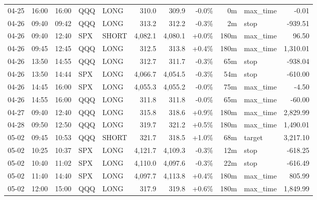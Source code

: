 \documentclass[11pt,a4paper,twoside]{article}
\begin{document}
\begin{center}
\begin{longtable}{>{\color{txtmain}}l l l l l r r r r >{\color{txtmain}}l r}
04-25 & 16:00 & 16:00 & QQQ & LONG & 310.0 & 309.9 & \textcolor{lossred}{-0.0\%} & 0m & max\_time & \textcolor{lossred}{-0.01} \\
04-26 & 09:40 & 09:42 & QQQ & LONG & 313.2 & 312.2 & \textcolor{lossred}{-0.3\%} & 2m & stop & \textcolor{lossred}{-939.51} \\
04-26 & 09:40 & 12:40 & SPX & SHORT & 4,082.1 & 4,080.1 & \textcolor{wingreen}{+0.0\%} & 180m & max\_time & \textcolor{wingreen}{96.50} \\
04-26 & 09:45 & 12:45 & QQQ & LONG & 312.5 & 313.8 & \textcolor{wingreen}{+0.4\%} & 180m & max\_time & \textcolor{wingreen}{1,310.01} \\
04-26 & 13:50 & 14:55 & QQQ & LONG & 312.7 & 311.7 & \textcolor{lossred}{-0.3\%} & 65m & stop & \textcolor{lossred}{-938.04} \\
04-26 & 13:50 & 14:44 & SPX & LONG & 4,066.7 & 4,054.5 & \textcolor{lossred}{-0.3\%} & 54m & stop & \textcolor{lossred}{-610.00} \\
04-26 & 14:45 & 16:00 & SPX & LONG & 4,055.3 & 4,055.2 & \textcolor{lossred}{-0.0\%} & 75m & max\_time & \textcolor{lossred}{-4.50} \\
04-26 & 14:55 & 16:00 & QQQ & LONG & 311.8 & 311.8 & \textcolor{lossred}{-0.0\%} & 65m & max\_time & \textcolor{lossred}{-60.00} \\
04-27 & 09:40 & 12:40 & QQQ & LONG & 315.8 & 318.6 & \textcolor{wingreen}{+0.9\%} & 180m & max\_time & \textcolor{wingreen}{2,829.99} \\
04-28 & 09:50 & 12:50 & QQQ & LONG & 319.7 & 321.2 & \textcolor{wingreen}{+0.5\%} & 180m & max\_time & \textcolor{wingreen}{1,490.01} \\
05-02 & 09:45 & 10:53 & QQQ & SHORT & 321.7 & 318.5 & \textcolor{wingreen}{+1.0\%} & 68m & target & \textcolor{wingreen}{3,217.10} \\
05-02 & 10:25 & 10:37 & SPX & LONG & 4,121.7 & 4,109.3 & \textcolor{lossred}{-0.3\%} & 12m & stop & \textcolor{lossred}{-618.25} \\
05-02 & 10:40 & 11:02 & SPX & LONG & 4,110.0 & 4,097.6 & \textcolor{lossred}{-0.3\%} & 22m & stop & \textcolor{lossred}{-616.49} \\
05-02 & 11:40 & 14:40 & SPX & LONG & 4,097.7 & 4,113.8 & \textcolor{wingreen}{+0.4\%} & 180m & max\_time & \textcolor{wingreen}{805.99} \\
05-02 & 12:00 & 15:00 & QQQ & LONG & 317.9 & 319.8 & \textcolor{wingreen}{+0.6\%} & 180m & max\_time & \textcolor{wingreen}{1,849.99} \\

\end{longtable}
\end{center}
\end{document}
